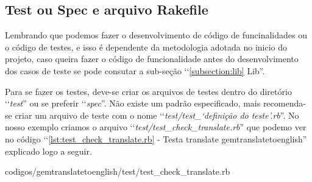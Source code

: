 \subsection{Test ou Spec e arquivo Rakefile}
\label{subsection:test_ou_spec_e_arquivo_rakefile}

Lembrando que podemos fazer o desenvolvimento de código de funcinalidades ou o código de testes, e isso é
dependente da metodologia adotada no inicio do projeto, caso queira fazer o código de funcionalidade antes
do desenvolvimento dos casos de teste se pode consutar a sub-seção ‘‘\ref{subsection:lib} Lib''.

Para se fazer os testes, deve-se criar os arquivos de testes dentro do diretório ‘‘\emph{test}'' ou se 
preferir ‘‘\emph{spec}''. Não existe um padrão especificado, mais recomenda-se criar um arquivo de 
teste com o nome ‘‘\emph{test/test\_‘definição do teste'.rb}''. No nosso exemplo criamos o arquivo 
‘‘\emph{test/test\_check\_translate.rb}'' que podemo ver no código ‘‘\ref{lst:test_check_translate.rb} - 
Testa translate gemtranslatetoenglish'' explicado logo a seguir.


{codigos/gemtranslatetoenglish/test/test_check_translate.rb}

